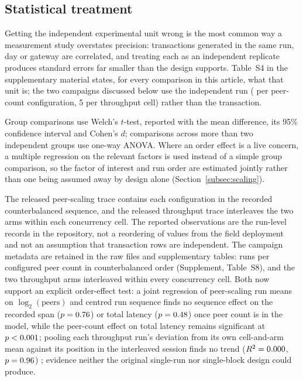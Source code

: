 \documentclass[a4paper,fleqn]{cas-dc}
\begin{document}
\subsection{Statistical treatment}
\label{subsec:stats}

Getting the independent experimental unit wrong is the most common way a
measurement study overstates precision: transactions generated in the same
run, day or gateway are correlated, and treating each as an independent
replicate produces standard errors far smaller than the design supports.
Table~S4 in the supplementary material states, for every comparison in
this article, what that unit is; the two campaigns discussed below use the
independent run (\PartRunsPerConfig{} per peer-count configuration, 5 per
throughput cell) rather than the transaction.

Group comparisons use Welch's $t$-test, reported with the mean difference,
its 95\% confidence interval and Cohen's $d$; comparisons across more than
two independent groups use one-way ANOVA. Where an order effect is a live
concern, a multiple regression on the relevant factors is used instead of a
simple group comparison, so the factor of interest and run order are
estimated jointly rather than one being assumed away by design alone
(Section~\ref{subsec:scaling}).

The released peer-scaling trace contains each configuration in the recorded
counterbalanced sequence, and the released throughput trace interleaves the
two arms within each concurrency cell. The reported observations are the
run-level records in the repository, not a reordering of values from the
field deployment and not an assumption that transaction rows are
independent. The campaign metadata are retained in the raw files and
supplementary tables: \PartRunsPerConfig{} runs per configured peer count in
counterbalanced order (Supplement, Table~S8), and the two throughput arms
interleaved within every concurrency cell. Both now support an explicit
order-effect
test: a joint regression of peer-scaling run means on $\log_2(\text{peers})$
and centred run sequence finds no sequence effect on the recorded span
($p=0.76$) or total latency ($p=0.48$) once
peer count is in the model, while the peer-count effect on total latency
remains significant at $p<0.001$; pooling each throughput
run's deviation from its own cell-and-arm mean against its position in the
interleaved session finds no trend ($R^2=0.000$, $p=0.96$)
; evidence
neither the original single-run nor single-block design could produce.
\end{document}

